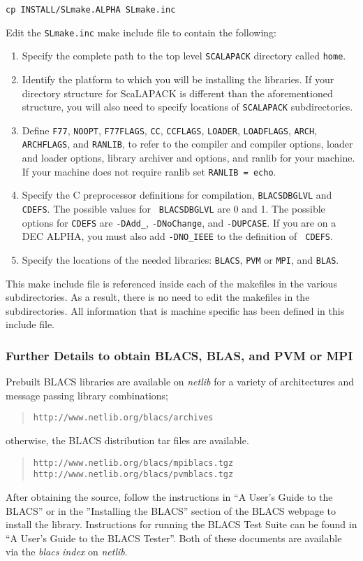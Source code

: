 \documentclass[11pt]{report}
\begin{document}
\begin{list}{}{}
\item {\tt cp INSTALL/SLmake.ALPHA SLmake.inc}
\end{list}

Edit the {\tt SLmake.inc} make include file to contain the following:
\begin{enumerate}
\item
Specify the complete path to the top level
{\tt SCALAPACK} directory called {\tt home}.
\item  Identify the platform to which you will
be installing the libraries.  If your directory structure for ScaLAPACK
is different than the aforementioned structure, you will also need to
specify locations of {\tt SCALAPACK} subdirectories.
\item
Define {\tt F77}, {\tt NOOPT},
{\tt F77FLAGS}, {\tt CC}, {\tt CCFLAGS}, {\tt LOADER}, {\tt LOADFLAGS},
{\tt ARCH}, {\tt ARCHFLAGS}, and {\tt RANLIB}, to refer to the compiler
and compiler options, loader and loader options, library archiver
and options, and ranlib for your machine.
If your machine does not require ranlib set {\tt RANLIB = echo}.
\item Specify the C preprocessor definitions for compilation,
{\tt BLACSDBGLVL} and {\tt CDEFS}.  The possible values for {\tt
BLACSDBGLVL} are 0 and 1.  The possible options for {\tt CDEFS} are
{\tt -DAdd\_}, {\tt -DNoChange}, and {\tt -DUPCASE}.  If you are on a
DEC ALPHA, you must also add {\tt -DNO\_IEEE} to the definition of {\tt
CDEFS}.
\item Specify the locations
of the needed libraries: {\tt BLACS}, {\tt PVM} or {\tt MPI}, and {\tt BLAS}.
\end{enumerate}
This make include file is referenced inside each of the makefiles in the
various subdirectories.  As a result, there is no need to edit the
makefiles in the subdirectories.  All information that is machine
specific has been defined in this include file.

\subsubsection{Further Details to obtain BLACS, BLAS, and PVM or MPI}

Prebuilt BLACS libraries are available on
{\em netlib} for a variety of architectures and message passing library
combinations;
\begin{quote}
{\tt http://www.netlib.org/blacs/archives}
\end{quote}
otherwise, the BLACS distribution tar files are available.
\begin{quote}
{\tt http://www.netlib.org/blacs/mpiblacs.tgz} \\
{\tt http://www.netlib.org/blacs/pvmblacs.tgz}
\end{quote}
After obtaining the source, follow the 
instructions in ``A User's Guide to the BLACS'' or in the ''Installing
the BLACS'' section of the BLACS webpage to install the library.  Instructions
for running the BLACS Test Suite can be found in ``A User's Guide to the
BLACS Tester''.  Both of these documents are available via the
{\em blacs} {\em index} on {\em netlib}.
\end{document}
